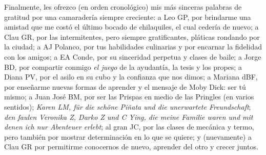 \begin{acknowledgements}
Finalmente, les ofrezco (en orden cronológico) mis más sinceras palabras de gratitud por una camaradería siempre creciente: a Leo GP, por brindarme una  amistad que me costó el último bocado de chilaquiles, el cual cedería de nuevo; a Clau GR, por las intermitentes, pero siempre gratificantes, pláticas rondando por la ciudad; a AJ Polanco, por tus habilidades culinarias y por encarnar la fidelidad con los amigos; a EA Conde, por su sinceridad perpetua y clases de baile; a Jorge BD, por compartir conmigo \emph{el juego} de la ayudantía, la tesis y los propes; a Diana PV, por el asilo en su cubo y la confianza que nos dimos; a Mariana dBF, por enseñarme nuevas formas de aprender y el mensaje de Moby Dick: ser tú mismo; a Juan José BM, por ser las Prispas en medio de las Pringles (en varios sentidos); \textit{Karen LM, für die schöne Piñata und die unerwartete Freundschaft}; \textit{den faulen Veronika Z, Darko Z und C Ying, die meine Familie waren und mit denen ich nur Abenteuer erlebt}; al gran JC, por las clases de mecánica y termo, pero también por mostrar determinación en lo que se quiere; y (nuevamente) a Clau GR por permitirme conocernos de nuevo, aprender del otro y crecer juntos.













\end{acknowledgements}




